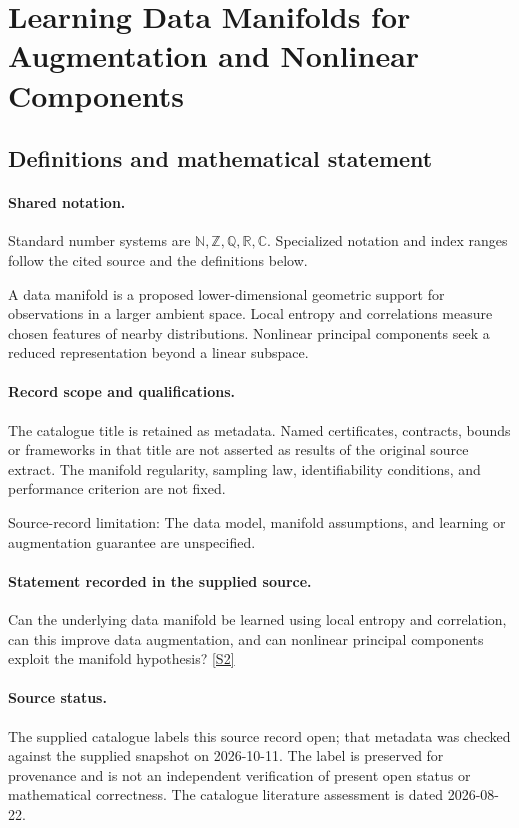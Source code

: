 \documentclass[11pt]{article}
\newcommand{\sref}[2]{\hyperlink{source:#1:#2}{[S#2]}}
\begin{document}
\section{Learning Data Manifolds for Augmentation and Nonlinear Components}\label{statement}

\subsection{Definitions and mathematical statement}

\paragraph{Shared notation.}Standard number systems are $\mathbb N,\mathbb Z,\mathbb Q,\mathbb R,\mathbb C$. Specialized notation and index ranges follow the cited source and the definitions below.


A data manifold is a proposed lower-dimensional geometric support for observations in a larger ambient space. Local entropy and correlations measure chosen features of nearby distributions. Nonlinear principal components seek a reduced representation beyond a linear subspace.
\paragraph{Record scope and qualifications.}
The catalogue title is retained as metadata. Named certificates, contracts, bounds or frameworks in that title are not asserted as results of the original source extract.
The manifold regularity, sampling law, identifiability conditions, and performance criterion are not fixed.

Source-record limitation: The data model, manifold assumptions, and learning or augmentation guarantee are unspecified.
\paragraph{Statement recorded in the supplied source.}
Can the underlying data manifold be learned using local entropy and correlation, can this improve data augmentation, and can nonlinear principal components exploit the manifold hypothesis? \sref{statement}{2}
\paragraph{Source status.}
The supplied catalogue labels this source record open; that metadata was checked against the supplied snapshot on 2026-10-11. The label is preserved for provenance and is not an independent verification of present open status or mathematical correctness. The catalogue literature assessment is dated 2026-08-22.
\end{document}
